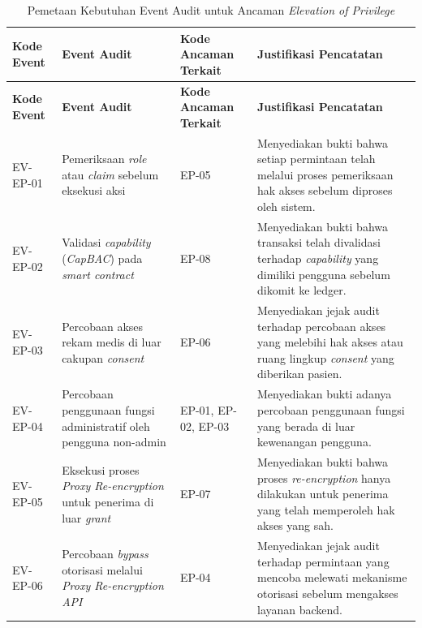 \begin{xltabular}{\textwidth}{|>{\centering\arraybackslash}p{1.4cm}|X|>{\centering\arraybackslash}p{1.9cm}|X|}
\caption{Pemetaan Kebutuhan Event Audit untuk Ancaman \textit{Elevation of Privilege}}
\label{tab:event-elevation-of-privilege}\\
\hline
\textbf{Kode Event} &
\textbf{Event Audit} &
\textbf{Kode Ancaman Terkait} &
\textbf{Justifikasi Pencatatan} \\
\hline
\endfirsthead

\hline
\textbf{Kode Event} &
\textbf{Event Audit} &
\textbf{Kode Ancaman Terkait} &
\textbf{Justifikasi Pencatatan} \\
\hline
\endhead

EV-EP-01 &
Pemeriksaan \textit{role} atau \textit{claim} sebelum eksekusi aksi &
EP-05 &
Menyediakan bukti bahwa setiap permintaan telah melalui proses pemeriksaan hak akses sebelum diproses oleh sistem.\\
\hline

EV-EP-02 &
Validasi \textit{capability} (\textit{CapBAC}) pada \textit{smart contract} &
EP-08 &
Menyediakan bukti bahwa transaksi telah divalidasi terhadap \textit{capability} yang dimiliki pengguna sebelum dikomit ke ledger.\\
\hline

EV-EP-03 &
Percobaan akses rekam medis di luar cakupan \textit{consent} &
EP-06 &
Menyediakan jejak audit terhadap percobaan akses yang melebihi hak akses atau ruang lingkup \textit{consent} yang diberikan pasien.\\
\hline

EV-EP-04 &
Percobaan penggunaan fungsi administratif oleh pengguna non-admin &
EP-01, EP-02, EP-03 &
Menyediakan bukti adanya percobaan penggunaan fungsi yang berada di luar kewenangan pengguna.\\
\hline

EV-EP-05 &
Eksekusi proses \textit{Proxy Re-encryption} untuk penerima di luar \textit{grant} &
EP-07 &
Menyediakan bukti bahwa proses \textit{re-encryption} hanya dilakukan untuk penerima yang telah memperoleh hak akses yang sah.\\
\hline

EV-EP-06 &
Percobaan \textit{bypass} otorisasi melalui \textit{Proxy Re-encryption API} &
EP-04 &
Menyediakan jejak audit terhadap permintaan yang mencoba melewati mekanisme otorisasi sebelum mengakses layanan backend.\\
\hline

\end{xltabular}

